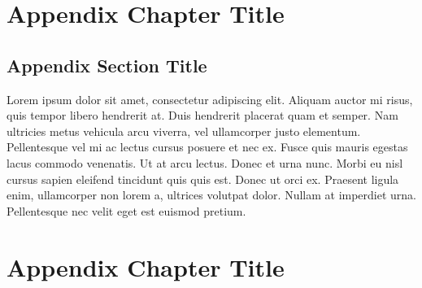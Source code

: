 \documentclass[
	UTF-8,
	11pt, %
	a4paper, %
]{LegrandOrangeBook}
\begin{document}
\cleardoublepage %
{} %
\printindex %


\chapterspaceabove{6.75cm} %
\chapterspacebelow{7.25cm} %

\begin{appendices}

\renewcommand{\chaptername}{Appendix} %


\chapter{Appendix Chapter Title}

\section{Appendix Section Title}

Lorem ipsum dolor sit amet, consectetur adipiscing elit. Aliquam auctor mi risus, quis tempor libero hendrerit at. Duis hendrerit placerat quam et semper. Nam ultricies metus vehicula arcu viverra, vel ullamcorper justo elementum. Pellentesque vel mi ac lectus cursus posuere et nec ex. Fusce quis mauris egestas lacus commodo venenatis. Ut at arcu lectus. Donec et urna nunc. Morbi eu nisl cursus sapien eleifend tincidunt quis quis est. Donec ut orci ex. Praesent ligula enim, ullamcorper non lorem a, ultrices volutpat dolor. Nullam at imperdiet urna. Pellentesque nec velit eget est euismod pretium.


\chapter{Appendix Chapter Title}


\end{appendices}
\end{document}
